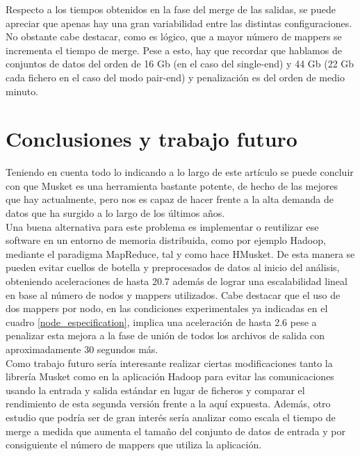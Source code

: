 \documentclass[conference]{IEEEtran}
\begin{document}
Respecto a los tiempos obtenidos en la fase del merge de las salidas, se puede apreciar que apenas hay una gran variabilidad entre las distintas configuraciones. No obstante cabe destacar, como es lógico, que a mayor número de mappers se incrementa el tiempo de merge. Pese a esto, hay que recordar que hablamos de conjuntos de datos del orden de 16 Gb (en el caso del single-end) y 44 Gb (22 Gb cada fichero en el caso del modo pair-end) y penalización es del orden de medio minuto.

\section{Conclusiones y trabajo futuro}
Teniendo en cuenta todo lo indicando a lo largo de este artículo se puede concluir con que Musket es una herramienta bastante potente, de hecho de las mejores que hay actualmente, pero nos es capaz de hacer frente a la alta demanda de datos que ha surgido a lo largo de los últimos años.\\
Una buena alternativa para este problema es implementar o reutilizar ese software en un entorno de memoria distribuida, como por ejemplo Hadoop, mediante el paradigma MapReduce, tal y como hace HMusket. De esta manera se pueden evitar cuellos de botella y preprocesados de datos al inicio del análisis, obteniendo aceleraciones de hasta 20.7 además de lograr una escalabilidad lineal en base al número de nodos y mappers utilizados. Cabe destacar que el uso de dos mappers por nodo, en las condiciones experimentales ya indicadas en el cuadro \ref{node_especification}, implica una aceleración de hasta 2.6 pese a penalizar esta mejora a la fase de unión de todos los archivos de salida con aproximadamente 30 segundos más.\\ 

Como trabajo futuro sería interesante realizar ciertas modificaciones tanto la librería Musket como en la aplicación Hadoop para evitar las comunicaciones usando la entrada y salida estándar en lugar de ficheros y comparar el rendimiento de esta segunda versión frente a la aquí expuesta. Además, otro estudio que podría ser de gran interés sería analizar como escala el tiempo de merge a medida que aumenta el tamaño del conjunto de datos de entrada y por consiguiente el número de mappers que utiliza la aplicación.\\




\end{document}
